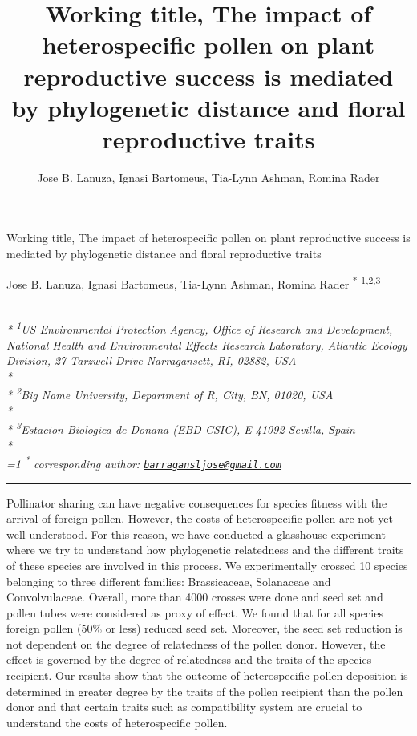 \documentclass[11pt,a4paper]{article}
\title{Working title, The impact of heterospecific pollen on plant reproductive
success is mediated by phylogenetic distance and floral reproductive
traits}
\author{
Jose B. Lanuza, Ignasi Bartomeus, Tia-Lynn Ashman, Romina Rader
}
\date{}
\begin{document}
\begin{singlespace}
\begin{center}
\huge Working title, The impact of heterospecific pollen on plant reproductive
success is mediated by phylogenetic distance and floral reproductive
traits
\end{center}
\begin{center}
\large
Jose B. Lanuza, Ignasi Bartomeus, Tia-Lynn Ashman, Romina Rader \textsuperscript{*} \textsuperscript{1,2,3} 
\end{center}
\begin{justify}
\footnotesize \emph{ 
\\*
\textsuperscript{1}US Environmental Protection Agency, Office of Research and Development,
National Health and Environmental Effects Research Laboratory, Atlantic
Ecology Division, 27 Tarzwell Drive Narragansett, RI, 02882, USA\\*
\\*
\textsuperscript{2}Big Name University, Department of R, City, BN, 01020, USA\\*
\\*
\textsuperscript{3}Estacion Biologica de Donana (EBD-CSIC), E-41092 Sevilla, Spain\\*
}
\setcounter{num}{1}
\\[0.1cm]
\footnotesize \emph{ 
\ifnum\value{num}=1%
\textsuperscript{*} corresponding author:
\fi
\href{mailto:barragansljose@gmail.com}{\nolinkurl{barragansljose@gmail.com}}
}
\end{justify}
\normalsize

\end{singlespace}


\singlespace

\vspace{2mm}\hrule

Pollinator sharing can have negative consequences for species fitness
with the arrival of foreign pollen. However, the costs of heterospecific
pollen are not yet well understood. For this reason, we have conducted a
glasshouse experiment where we try to understand how phylogenetic
relatedness and the different traits of these species are involved in
this process. We experimentally crossed 10 species belonging to three
different families: Brassicaceae, Solanaceae and Convolvulaceae.
Overall, more than 4000 crosses were done and seed set and pollen tubes
were considered as proxy of effect. We found that for all species
foreign pollen (50\% or less) reduced seed set. Moreover, the seed set
reduction is not dependent on the degree of relatedness of the pollen
donor. However, the effect is governed by the degree of relatedness and
the traits of the species recipient. Our results show that the outcome
of heterospecific pollen deposition is determined in greater degree by
the traits of the pollen recipient than the pollen donor and that
certain traits such as compatibility system are crucial to understand
the costs of heterospecific pollen.
\end{document}

